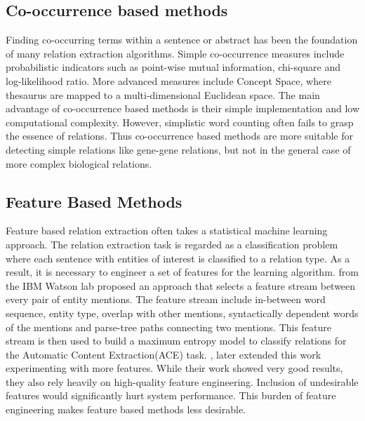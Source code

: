 \subsection{Co-occurrence based methods}
Finding co-occurring terms within a sentence or abstract has been the foundation of many relation extraction algorithms\cite{chaussabel2002mining,becker2003pubmatrix,tanabe1999medminer,stapley2000biobibliometrics,jenssen2001literature,wren2004knowledge}. Simple co-occurrence measures include probabilistic indicators such as point-wise mutual information, chi-square and log-likelihood ratio. More advanced measures include Concept Space, where thesaurus are mapped to a multi-dimensional Euclidean space\cite{leroy2005genescene, van2004constructing}. The main advantage of co-occurrence based methods is their simple implementation and low computational complexity. However, simplistic word counting often fails to grasp the essence of relations. Thus co-occurrence based methods are more suitable for detecting simple relations like gene-gene relations, but not in the general case of more complex biological relations. 

\subsection{Feature Based Methods}
Feature based relation extraction often takes a statistical machine learning approach. The relation extraction task is regarded as a classification problem where each sentence with entities of interest is classified to a relation type. As a result, it is necessary to engineer a set of features for the learning algorithm. \citet*{kambhatla2004combining} from the IBM Watson lab proposed an approach that selects a feature stream between every pair of entity mentions. The feature stream include in-between word sequence, entity type, overlap with other mentions, syntactically dependent words of the mentions and parse-tree paths connecting two mentions. This feature stream is then used to build a maximum entropy model to classify relations for the Automatic Content Extraction(ACE) task. \citet*{guodong2005exploring}, \citet*{jiang2007systematic} later extended this work experimenting with more features. While their work showed very good results, they also rely heavily on high-quality feature engineering. Inclusion of undesirable features would significantly hurt system performance. This burden of feature engineering makes feature based methods less desirable\cite{liu2013approximate}.

